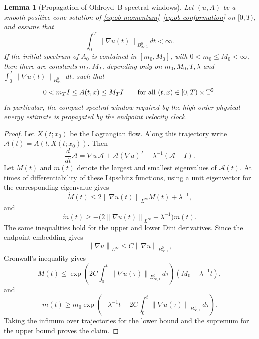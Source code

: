 \documentclass[11pt]{article}
\newtheorem{lemma}{Lemma}[section]
\newcommand{\T}{\mathbb T}
\newcommand{\norm}[1]{\left\lVert #1\right\rVert}
\newcommand{\Besov}{B^0_{\infty,1}}
\begin{document}
\begin{lemma}[Propagation of Oldroyd--B spectral windows]
\label{lem:oldroyd-spectral-window}
Let \((u,A)\) be a smooth positive-cone solution of
\eqref{eq:ob-momentum}--\eqref{eq:ob-conformation} on \([0,T)\), and assume
that
\[
  \int_0^T \norm{\nabla u(t)}_{\Besov}\,dt <\infty .
\]
If the initial spectrum of \(A_0\) is contained in \([m_0,M_0]\), with
\(0<m_0\le M_0<\infty\), then there are constants
\(m_T,M_T\), depending only on \(m_0,M_0,T,\lambda\) and
\(\int_0^T\norm{\nabla u(t)}_{\Besov}\,dt\), such that
\[
  0<m_T I\le A(t,x)\le M_T I
  \qquad \hbox{for all }(t,x)\in[0,T)\times\T^2 .
\]
In particular, the compact spectral window required by the high-order physical
energy estimate is propagated by the endpoint velocity clock.
\end{lemma}

\begin{proof}
Let \(X(t;x_0)\) be the Lagrangian flow.  Along this trajectory write
\(\mathcal A(t)=A(t,X(t;x_0))\).  Then
\[
  \frac{d}{dt}\mathcal A
  =\nabla u\,\mathcal A+\mathcal A(\nabla u)^T
  -\lambda^{-1}(\mathcal A-I).
\]
Let \(M(t)\) and \(m(t)\) denote the largest and smallest eigenvalues of
\(\mathcal A(t)\).  At times of differentiability of these Lipschitz functions,
using a unit eigenvector for the corresponding eigenvalue gives
\[
  \dot M(t)
  \le 2\norm{\nabla u(t)}_{L^\infty}M(t)+\lambda^{-1},
\]
and
\[
  \dot m(t)
  \ge -\bigl(2\norm{\nabla u(t)}_{L^\infty}+\lambda^{-1}\bigr)m(t).
\]
The same inequalities hold for the upper and lower Dini derivatives.  Since the
endpoint embedding gives
\[
  \norm{\nabla u}_{L^\infty}\le C\norm{\nabla u}_{B^0_{\infty,1}},
\]
Gronwall's inequality gives
\[
  M(t)\le \exp\left(2C\int_0^t\norm{\nabla u(\tau)}_{\Besov}\,d\tau\right)
  \left(M_0+\lambda^{-1}t\right),
\]
and
\[
  m(t)\ge m_0\exp\left(-\lambda^{-1}t
  -2C\int_0^t\norm{\nabla u(\tau)}_{\Besov}\,d\tau\right).
\]
Taking the infimum over trajectories for the lower bound and the supremum for
the upper bound proves the claim.
\end{proof}
\end{document}
